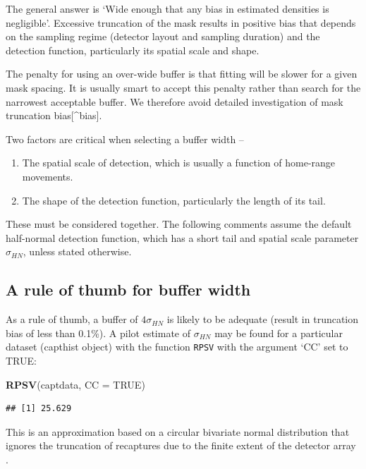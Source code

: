 \documentclass[
]{book}
\newenvironment{Shaded}{\begin{snugshade}}{\end{snugshade}}
\newcommand{\AttributeTok}[1]{\textcolor[rgb]{0.13,0.29,0.53}{#1}}
\newcommand{\ConstantTok}[1]{\textcolor[rgb]{0.56,0.35,0.01}{#1}}
\newcommand{\FunctionTok}[1]{\textcolor[rgb]{0.13,0.29,0.53}{\textbf{#1}}}
\newcommand{\NormalTok}[1]{#1}
\providecommand{\tightlist}{%
  \setlength{\itemsep}{0pt}\setlength{\parskip}{0pt}}
\begin{document}
The general answer is `Wide enough that any bias in estimated densities is negligible'. Excessive truncation of the mask results in positive bias that depends on the sampling regime (detector layout and sampling duration) and the detection function, particularly its spatial scale and shape.

The penalty for using an over-wide buffer is that fitting will be slower for a given mask spacing. It is usually smart to accept this penalty rather than search for the narrowest acceptable buffer. We therefore avoid detailed investigation of mask truncation bias{[}\^{}bias{]}.

Two factors are critical when selecting a buffer width --

\begin{enumerate}
\def\labelenumi{\arabic{enumi}.}
\tightlist
\item
  The spatial scale of detection, which is usually a function of home-range movements.
\item
  The shape of the detection function, particularly the length of its tail.
\end{enumerate}

These must be considered together. The following comments assume the default half-normal detection function, which has a short tail and spatial scale parameter \(\sigma_{HN}\), unless stated otherwise.

\subsection{A rule of thumb for buffer width}\label{a-rule-of-thumb-for-buffer-width}

As a rule of thumb, a buffer of \(4\sigma_{HN}\) is likely to be adequate (result in truncation bias of less than 0.1\%). A pilot estimate of \(\sigma_{HN}\) may be found for a particular dataset (capthist object) with the function \texttt{RPSV} with the argument `CC' set to TRUE:

\begin{Shaded}
\begin{Highlighting}[]
\FunctionTok{RPSV}\NormalTok{(captdata, }\AttributeTok{CC =} \ConstantTok{TRUE}\NormalTok{)}
\end{Highlighting}
\end{Shaded}

\begin{verbatim}
## [1] 25.629
\end{verbatim}

This is an approximation based on a circular bivariate normal distribution that ignores the truncation of recaptures due to the finite extent of the detector array \citep{cc58}.
\end{document}
